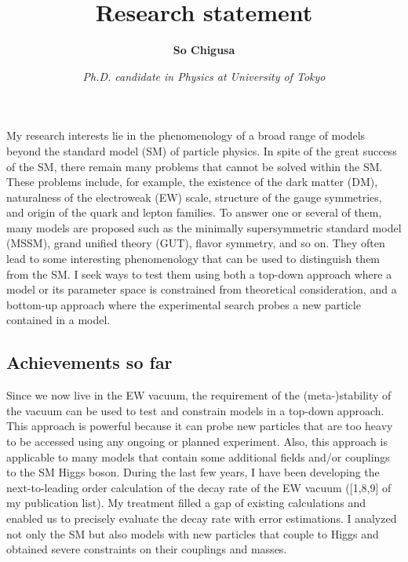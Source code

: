\documentclass[12pt,notitlepage]{article}
\title{\vspace*{-3cm}Research statement}
\author{\textbf{So Chigusa}}
\date{\vspace*{-4mm}\textit{Ph.D. candidate in Physics at University of Tokyo}}
\begin{document}
\maketitle

My research interests lie in the phenomenology of a broad range of models beyond the standard model (SM) of particle physics.
In spite of the great success of the SM, there remain many problems that cannot be solved within the SM.
These problems include, for example, the existence of the dark matter (DM), naturalness of the electroweak (EW) scale, structure of the gauge symmetries, and origin of the quark and lepton families.
To answer one or several of them, many models are proposed such as the minimally supersymmetric standard model (MSSM), grand unified theory (GUT), flavor symmetry, and so on.
They often lead to some interesting phenomenology that can be used to distinguish them from the SM.
I seek ways to test them using both a top-down approach where a model or its parameter space is constrained from theoretical consideration, and a bottom-up approach where the experimental search probes a new particle contained in a model.

\vspace*{-2mm}
\subsection*{Achievements so far}

Since we now live in the EW vacuum, the requirement of the (meta-)stability of the vacuum can be used to test and constrain models in a top-down approach.
This approach is powerful because it can probe new particles that are too heavy to be accessed using any ongoing or planned experiment.
Also, this approach is applicable to many models that contain some additional fields and/or couplings to the SM Higgs boson.
During the last few years, I have been developing the next-to-leading order calculation of the decay rate of the EW vacuum ([1,8,9] of my publication list).
My treatment filled a gap of existing calculations and enabled us to precisely evaluate the decay rate with error estimations.
I analyzed not only the SM but also models with new particles that couple to Higgs and obtained severe constraints on their couplings and masses.
\end{document}
